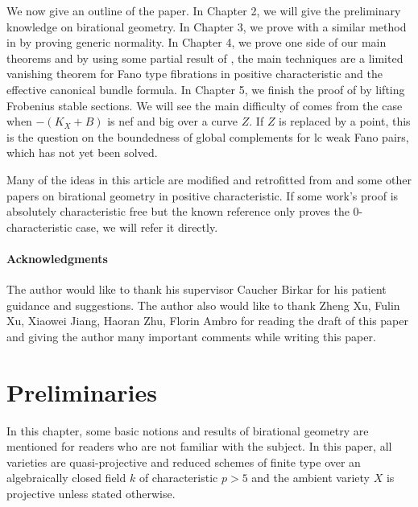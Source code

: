 \documentclass[letterpaper,reqno,12pt]{amsart}
\newcommand{\tbf}{\textbf}
\numberwithin{equation}{section}
\theoremstyle{plain}
\begin{document}
We now give an outline of the paper. In Chapter 2, we will give the preliminary knowledge on birational geometry. In Chapter 3, we prove  with a similar method in \cite{jxtcbf} by proving generic normality. In Chapter 4, we prove one side of our main theorems  and  by using some partial result of , the main techniques are a limited vanishing theorem for Fano type fibrations in positive characteristic and the effective canonical bundle formula. In Chapter 5, we finish the proof of  by lifting Frobenius stable sections. We will see the main difficulty of  comes from the case when $-(K_X+B)$ is nef and big over a curve $Z$. If $Z$ is replaced by a point, this is the question on the boundedness of global complements for lc weak Fano pairs, which has not yet been solved.

Many of the ideas in this article are modified and retrofitted from \cite{birkar2019antipluricanonicalsystemsfanovarieties} and some other papers on birational geometry in positive characteristic. If some work’s proof is absolutely characteristic free but the known reference only proves the 0-characteristic case, we will refer it directly.

\paragraph{\tbf{Acknowledgments}}
    The author would like to thank his supervisor Caucher Birkar for his patient guidance and suggestions. The author also would like to thank Zheng Xu, Fulin Xu, Xiaowei Jiang, Haoran Zhu, Florin Ambro for reading the draft of this paper and giving the author many important comments while writing this paper.





\section{Preliminaries}









In this chapter, some basic notions and results of birational geometry are mentioned for readers who are not familiar with the subject. In this paper, all varieties are quasi-projective and reduced schemes of finite type over an algebraically closed field $k$ of characteristic $p>5$ and the ambient variety $X$ is projective unless stated otherwise. 
\end{document}
